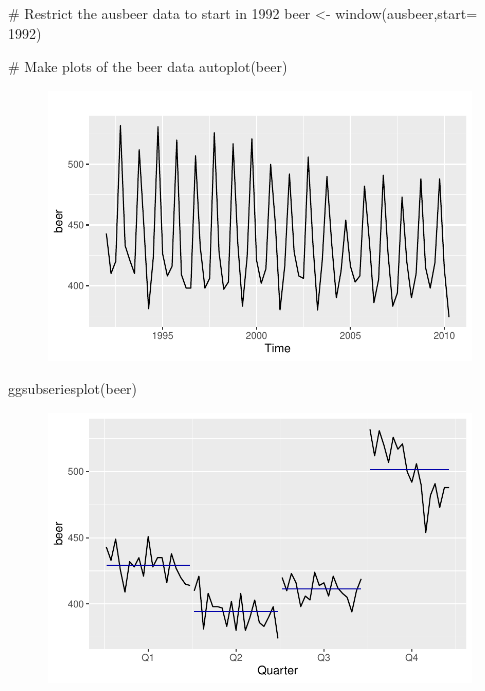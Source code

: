 \documentclass[
  letterpaper,
  DIV=11,
  numbers=noendperiod]{scrartcl}
\newenvironment{Shaded}{\begin{snugshade}}{\end{snugshade}}
\newcommand{\AttributeTok}[1]{\textcolor[rgb]{0.40,0.45,0.13}{#1}}
\newcommand{\CommentTok}[1]{\textcolor[rgb]{0.37,0.37,0.37}{#1}}
\newcommand{\DecValTok}[1]{\textcolor[rgb]{0.68,0.00,0.00}{#1}}
\newcommand{\FunctionTok}[1]{\textcolor[rgb]{0.28,0.35,0.67}{#1}}
\newcommand{\NormalTok}[1]{\textcolor[rgb]{0.00,0.23,0.31}{#1}}
\newcommand{\OtherTok}[1]{\textcolor[rgb]{0.00,0.23,0.31}{#1}}
\begin{document}
\begin{Shaded}
\begin{Highlighting}[]
\CommentTok{\# Restrict the ausbeer data to start in 1992}
\NormalTok{beer }\OtherTok{\textless{}{-}} \FunctionTok{window}\NormalTok{(ausbeer,}\AttributeTok{start=} \DecValTok{1992}\NormalTok{)}

\CommentTok{\# Make plots of the beer data}
\FunctionTok{autoplot}\NormalTok{(beer)}
\end{Highlighting}
\end{Shaded}

\begin{figure}[H]

{\centering \includegraphics{forecasting_datacamp_ex_files/figure-pdf/unnamed-chunk-3-4.pdf}

}

\end{figure}

\begin{Shaded}
\begin{Highlighting}[]
\FunctionTok{ggsubseriesplot}\NormalTok{(beer)}
\end{Highlighting}
\end{Shaded}

\begin{figure}[H]

{\centering \includegraphics{forecasting_datacamp_ex_files/figure-pdf/unnamed-chunk-3-5.pdf}

}

\end{figure}
\end{document}
